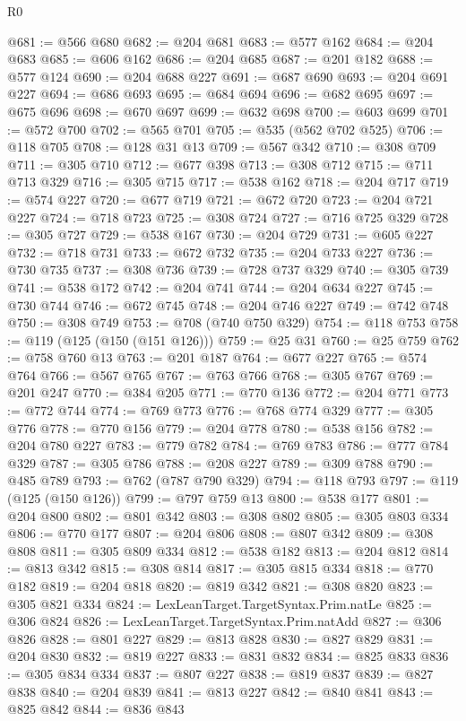 \begin{lexlean}{R0}
\begin{coremodule}
@681 := @566 @680
@682 := @204 @681
@683 := @577 @162
@684 := @204 @683
@685 := @606 @162
@686 := @204 @685
@687 := @201 @182
@688 := @577 @124
@690 := @204 @688 @227
@691 := @687 @690
@693 := @204 @691 @227
@694 := @686 @693
@695 := @684 @694
@696 := @682 @695
@697 := @675 @696
@698 := @670 @697
@699 := @632 @698
@700 := @603 @699
@701 := @572 @700
@702 := @565 @701
@705 := @535 (@562 @702 @525)
@706 := @118 @705
@708 := @128 @31 @13
@709 := @567 @342
@710 := @308 @709
@711 := @305 @710
@712 := @677 @398
@713 := @308 @712
@715 := @711 @713 @329
@716 := @305 @715
@717 := @538 @162
@718 := @204 @717
@719 := @574 @227
@720 := @677 @719
@721 := @672 @720
@723 := @204 @721 @227
@724 := @718 @723
@725 := @308 @724
@727 := @716 @725 @329
@728 := @305 @727
@729 := @538 @167
@730 := @204 @729
@731 := @605 @227
@732 := @718 @731
@733 := @672 @732
@735 := @204 @733 @227
@736 := @730 @735
@737 := @308 @736
@739 := @728 @737 @329
@740 := @305 @739
@741 := @538 @172
@742 := @204 @741
@744 := @204 @634 @227
@745 := @730 @744
@746 := @672 @745
@748 := @204 @746 @227
@749 := @742 @748
@750 := @308 @749
@753 := @708 (@740 @750 @329)
@754 := @118 @753
@758 := @119 (@125 (@150 (@151 @126)))
@759 := @25 @31
@760 := @25 @759
@762 := @758 @760 @13
@763 := @201 @187
@764 := @677 @227
@765 := @574 @764
@766 := @567 @765
@767 := @763 @766
@768 := @305 @767
@769 := @201 @247
@770 := @384 @205
@771 := @770 @136
@772 := @204 @771
@773 := @772 @744
@774 := @769 @773
@776 := @768 @774 @329
@777 := @305 @776
@778 := @770 @156
@779 := @204 @778
@780 := @538 @156
@782 := @204 @780 @227
@783 := @779 @782
@784 := @769 @783
@786 := @777 @784 @329
@787 := @305 @786
@788 := @208 @227
@789 := @309 @788
@790 := @485 @789
@793 := @762 (@787 @790 @329)
@794 := @118 @793
@797 := @119 (@125 (@150 @126))
@799 := @797 @759 @13
@800 := @538 @177
@801 := @204 @800
@802 := @801 @342
@803 := @308 @802
@805 := @305 @803 @334
@806 := @770 @177
@807 := @204 @806
@808 := @807 @342
@809 := @308 @808
@811 := @305 @809 @334
@812 := @538 @182
@813 := @204 @812
@814 := @813 @342
@815 := @308 @814
@817 := @305 @815 @334
@818 := @770 @182
@819 := @204 @818
@820 := @819 @342
@821 := @308 @820
@823 := @305 @821 @334
@824 := LexLeanTarget.TargetSyntax.Prim.natLe
@825 := @306 @824
@826 := LexLeanTarget.TargetSyntax.Prim.natAdd
@827 := @306 @826
@828 := @801 @227
@829 := @813 @828
@830 := @827 @829
@831 := @204 @830
@832 := @819 @227
@833 := @831 @832
@834 := @825 @833
@836 := @305 @834 @334
@837 := @807 @227
@838 := @819 @837
@839 := @827 @838
@840 := @204 @839
@841 := @813 @227
@842 := @840 @841
@843 := @825 @842
@844 := @836 @843

\end{coremodule}
\end{lexlean}

